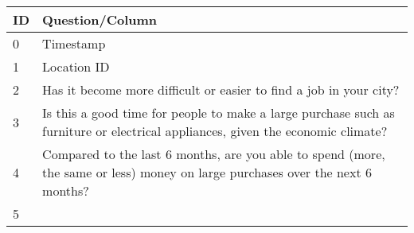 \begin{longtable}[]{@{}ll@{}}
\toprule
\begin{minipage}[b]{0.05\columnwidth}\raggedright
ID\strut
\end{minipage} & \begin{minipage}[b]{0.89\columnwidth}\raggedright
Question/Column\strut
\end{minipage}\tabularnewline
\midrule
\endhead
\begin{minipage}[t]{0.05\columnwidth}\raggedright
0\strut
\end{minipage} & \begin{minipage}[t]{0.89\columnwidth}\raggedright
Timestamp\strut
\end{minipage}\tabularnewline
\begin{minipage}[t]{0.05\columnwidth}\raggedright
1\strut
\end{minipage} & \begin{minipage}[t]{0.89\columnwidth}\raggedright
Location ID\strut
\end{minipage}\tabularnewline
\begin{minipage}[t]{0.05\columnwidth}\raggedright
2\strut
\end{minipage} & \begin{minipage}[t]{0.89\columnwidth}\raggedright
Has it become more difficult or easier to find a job in your city?\strut
\end{minipage}\tabularnewline
\begin{minipage}[t]{0.05\columnwidth}\raggedright
3\strut
\end{minipage} & \begin{minipage}[t]{0.89\columnwidth}\raggedright
Is this a good time for people to make a large purchase such as
furniture or electrical appliances, given the economic climate?\strut
\end{minipage}\tabularnewline
\begin{minipage}[t]{0.05\columnwidth}\raggedright
4\strut
\end{minipage} & \begin{minipage}[t]{0.89\columnwidth}\raggedright
Compared to the last 6 months, are you able to spend (more, the same or
less) money on large purchases over the next 6 months?\strut
\end{minipage}\tabularnewline
\begin{minipage}[t]{0.05\columnwidth}\raggedright
5\strut
\end{minipage} & \begin{minipage}[t]{0.89\columnwidth}\raggedright

\end{minipage}
\end{longtable}
